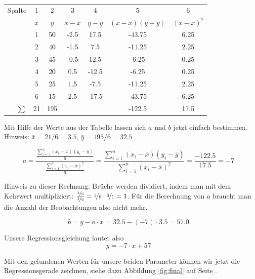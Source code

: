 \documentclass[ngerman, 12pt,parskip=half]{scrartcl}
\begin{document}
\begin{center}
\begin{tabular}{r|cccccc} \toprule
Spalte & 1 & 2 & 3 & 4 & 5 & 6 \\
& $x$	&	$y$	&	$x-\bar{x}$	&	$y-\bar{y}$	&	$(x-\bar{x})(y-\bar{y})$	&	$(x-\bar{x})^2$	\\ \midrule
& 1 &  50 &      -2.5 &      17.5 &                -43.75 &          6.25 \\
& 2 &  40 &      -1.5 &       7.5 &                -11.25 &          2.25 \\
& 3 &  45 &      -0.5 &      12.5 &                 -6.25 &          0.25 \\
& 4 &  20 &       0.5 &     -12.5 &                 -6.25 &          0.25 \\
& 5 &  25 &       1.5 &      -7.5 &                -11.25 &          2.25 \\
& 6 &  15 &       2.5 &     -17.5 &                -43.75 &          6.25 \\
\midrule
$\sum$ & 21 & 195 & & & -122.5 & 17.5 \\ \bottomrule
\end{tabular}
\end{center}

Mit Hilfe der Werte aus der Tabelle lassen sich \(a\) und \(b\) jetzt einfach bestimmen. Hinweis: \(\bar x = 21/6 = 3.5\), \(\bar y = 195/6 = 32.5 \)

\[ a = \frac{\frac{\sum_{i=1}^n \left(x_i-\bar x \right)\left(y_i-\bar y \right)}{6}}{ 
\frac{\sum_{i=1}^6 \left( x_i - \bar x \right)^2}{6}} = \frac{\sum_{i=1}^n\left(x_i-\bar x \right)\left(y_i-\bar y \right)}{\sum_{i=1}^n \left(x_i-\bar x \right)^2}  = \frac{-122.5}{17.5} = -7 \]

Hinweis zu dieser Rechnung: Brüche werden dividiert, indem man mit dem Kehrwert multipliziert: \( \frac{\nicefrac{1}{6}}{\nicefrac{1}{6}}   = \nicefrac{1}{6} \cdot \nicefrac{6}{1}  = 1 \). Für die Berechnung von \(a\) braucht man die Anzahl der Beobachtungen also nicht mehr.

\[ b = \bar y - a\cdot \bar x = 32.5
 - (-7) \cdot 3.5 = 57.0
 \]

Unsere Regressionsgleichung lautet also
\[
y = -7 \cdot x + 57
\]


Mit den gefundenen Werten für unsere beiden Parameter können wir jetzt die Regressionsgerade zeichnen, siehe dazu Abbildung \ref{fig:final} auf Seite \pageref{fig:final}.
\end{document}
